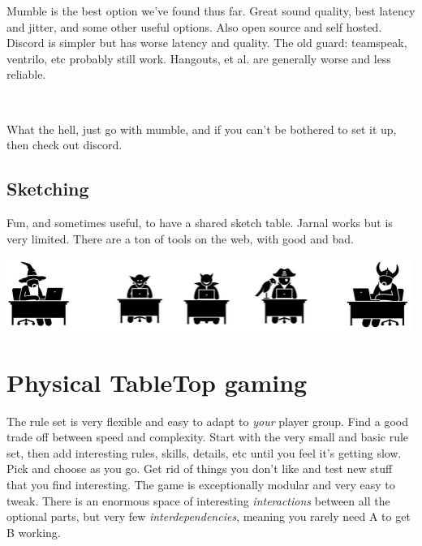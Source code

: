 Mumble is the best option we've found thus far. Great sound quality, best latency and jitter, and some other useful options. Also open source and self hosted. Discord is simpler but has worse latency and quality. The old guard: teamspeak, ventrilo, etc probably still work. Hangouts, et al. are generally worse and less reliable.

\

What the hell, just go with mumble, and if you can't be bothered to set it up, then check out discord.


\subsection*{Sketching} Fun, and sometimes useful, to have a shared sketch table. Jarnal works but is very limited. There are a ton of tools on the web, with good and bad.


\vfill

\begin{center}
\includegraphics[width=0.99\textwidth]{./fig/online-warriors.png}
\end{center}








\clearpage %

\section*{Physical TableTop gaming}

The rule set is very flexible and easy to adapt to \emph{your} player group. Find a good trade off between speed and complexity. Start with the very small and basic rule set, then add interesting rules, skills, details, etc until you feel it's getting slow. Pick and choose as you go. Get rid of things you don't like and test new stuff that you find interesting. The game is exceptionally modular and very easy to tweak. There is an enormous space of interesting \emph{interactions} between all the optional parts, but very few \emph{interdependencies}, meaning you rarely need A to get B working.


